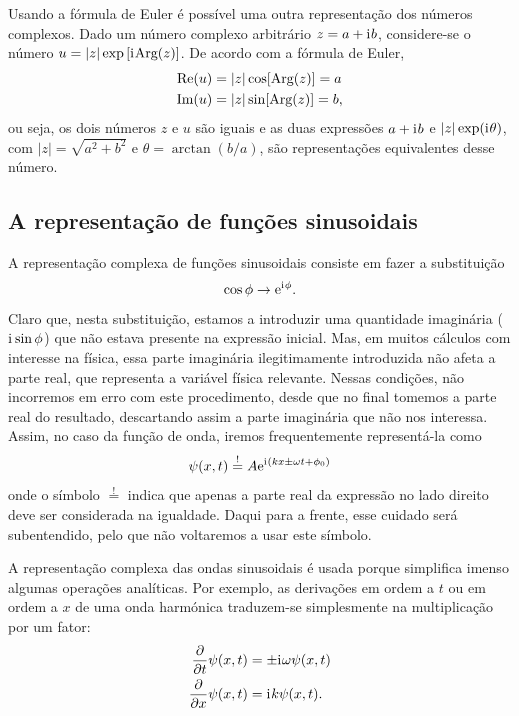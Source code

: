 Usando a fórmula de Euler é possível uma outra representação dos números
complexos. Dado um número complexo arbitrário $ z=a+\text{i}\mkern1mu b$, considere-se o
número $ u = | z|\exp\left[\text{i}\mkern1mu\text{Arg}( z)\right]$. De
acordo com a fórmula de Euler, 
\begin{align*}
  \text{Re}( u)&=| z|\cos[\text{Arg}( z)]=a\\
  \text{Im}( u)&=| z|\sin[\text{Arg}( z)]=b,
\end{align*}
ou seja, os dois números $ z$ e $ u$ são iguais e as duas expressões
$a+\text{i}\mkern1mu b$ e $| z|\exp(\text{i}\mkern1mu\theta)$, com
$| z|=\sqrt{a^2+b^2}$ e $\theta=\arctan(b/a)$, são representações
equivalentes desse número.

\subsection{A representação de funções sinusoidais}
\label{sec:complexharm}
A representação complexa de funções sinusoidais consiste em fazer a substituição
\begin{equation*}
  \cos\phi \rightarrow \text{e}^{\text{i}\mkern1mu \phi}.
\end{equation*}
Claro que, nesta substituição, estamos a introduzir uma quantidade imaginária
($\text{i}\mkern1mu\sin\phi$) que não estava presente na expressão inicial. Mas, em muitos
cálculos com interesse na física, essa parte imaginária ilegitimamente
introduzida não afeta a parte real, que representa a variável física relevante.
Nessas condições, não incorremos em erro com este procedimento, desde que no
final tomemos a parte real do resultado, descartando assim a parte imaginária
que não nos interessa. Assim, no caso da função de onda, iremos frequentemente
representá-la como
\begin{equation*}
  \psi(x,t)\stackrel{!}{=}A\text{e}^{\text{i}\mkern1mu(kx\pm\omega t+\phi_0)}
\end{equation*}
onde o símbolo $\stackrel{!}{=}$ indica que apenas a parte real da expressão no
lado direito deve ser considerada na igualdade. Daqui para a frente, esse
cuidado será subentendido, pelo que não voltaremos a usar este símbolo.

A representação complexa das ondas sinusoidais é usada porque simplifica imenso
algumas operações analíticas. Por exemplo, as derivações em ordem a $t$ ou em
ordem a $x$ de uma onda harmónica traduzem-se simplesmente na multiplicação por
um fator:
\begin{align*}
  \frac{\partial }{\partial t}\psi(x,t)&=\pm\text{i}\mkern1mu\omega\psi(x,t)\\
  \frac{\partial }{\partial x}\psi(x,t)&=\text{i}\mkern1mu k\psi(x,t).
\end{align*}

